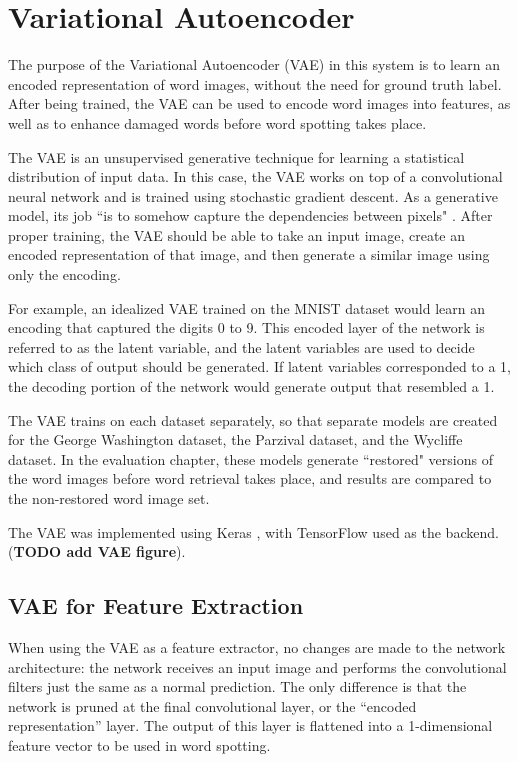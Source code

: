 \documentclass[final]{ukthesis}
\begin{document}
%
%
\section{Variational Autoencoder}
\label{sec:vae}

The purpose of the Variational Autoencoder (VAE) \cite{kingma2013auto} in this system is to learn an encoded representation of word images, without the need for ground truth label. After being trained, the VAE can be used to encode word images into features, as well as to enhance damaged words before word spotting takes place.

The VAE is an unsupervised generative technique for learning a statistical distribution of input data. In this case, the VAE works on top of a convolutional neural network and is trained using stochastic gradient descent. As a generative model, its job ``is to somehow capture the dependencies between pixels" \cite{doersch2016tutorial}. After proper training, the VAE should be able to take an input image, create an encoded representation of that image, and then generate a similar image using only the encoding.

For example, an idealized VAE trained on the MNIST dataset would learn an encoding that captured the digits 0 to 9. This encoded layer of the network is referred to as the latent variable, and the latent variables are used to decide which class of output should be generated. If latent variables corresponded to a 1, the decoding portion of the network would generate output that resembled a 1.

The VAE trains on each dataset separately, so that separate models are created for the George Washington dataset, the Parzival dataset, and the Wycliffe dataset. In the evaluation chapter, these models generate ``restored" versions of the word images before word retrieval takes place, and results are compared to the non-restored word image set.

The VAE was implemented using Keras \cite{chollet2015keras}, with TensorFlow \cite{abadi2016tensorflow} used as the backend. (\textbf{TODO add VAE figure}).

\subsection{VAE for Feature Extraction}
When using the VAE as a feature extractor, no changes are made to the network architecture: the network receives an input image and performs the convolutional filters just the same as a normal prediction. The only difference is that the network is pruned at the final convolutional layer, or the ``encoded representation'' layer. The output of this layer is flattened into a 1-dimensional feature vector to be used in word spotting.
\end{document}
